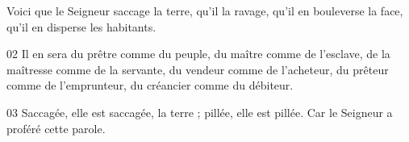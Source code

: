 Voici que le Seigneur saccage la terre, qu’il la ravage, qu’il en bouleverse la face, qu’il en disperse les habitants.

02 Il en sera du prêtre comme du peuple, du maître comme de l’esclave, de la maîtresse comme de la servante, du vendeur comme de l’acheteur, du prêteur comme de l’emprunteur, du créancier comme du débiteur.

03 Saccagée, elle est saccagée, la terre ; pillée, elle est pillée. Car le Seigneur a proféré cette parole.
